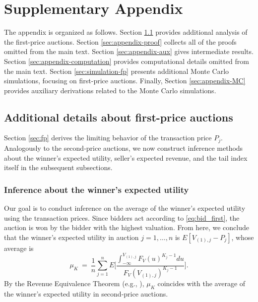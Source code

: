 \section{Supplementary Appendix}\label{sec:appendix}

The appendix is organized as follows. Section \ref{sec:appendix-fp} provides additional analysis of the first-price auctions. Section \ref{sec:appendix-proof} collects all of the proofs omitted from the main text. Section \ref{sec:appendix-aux} gives intermediate results. Section \ref{sec:appendix-computation} provides computational details omitted from the main text. Section \ref{sec:simulation-fp} presents additional Monte Carlo simulations, focusing on first-price auctions. Finally, Section \ref{sec:appendix-MC} provides auxiliary derivations related to the Monte Carlo simulations.

\subsection{Additional details about first-price auctions}\label{sec:appendix-fp}

Section \ref{sec:fp} derives the limiting behavior of the transaction price $P_j$. Analogously to the second-price auctions, we now construct inference methods about the winner's expected utility, seller's expected revenue, and the tail index itself in the subsequent subsections.

\subsubsection{Inference about the winner's expected utility}\label{sec:fp-supplus}

Our goal is to conduct inference on the average of the winner's expected utility using the transaction prices. Since bidders act according to \eqref{eq:bid_first}, the auction is won by the bidder with the highest valuation. From here, we conclude that the winner's expected utility in auction $j=1,\dots,n$ is $E[V_{(1),j}-P_{j}]$, whose average is
\begin{equation}
\mu _{K}~{=}~\frac{1}{n}\sum_{j=1}^{n}E\Big[\frac{ \int_{-\infty}^{V_{(1),j}}{F_{V}(u)^{K_{j}-1}}du}{F_{V}(V_{(1),j})^{K_{j}-1}}\Big] .
\label{eq:fp_muK_as_fn_ofV}
\end{equation}
By the Revenue Equivalence Theorem (e.g., \citet[Section 3]{krishna2009book}), $\mu _{K}$ coincides with the average of the winner's expected utility in second-price auctions.

